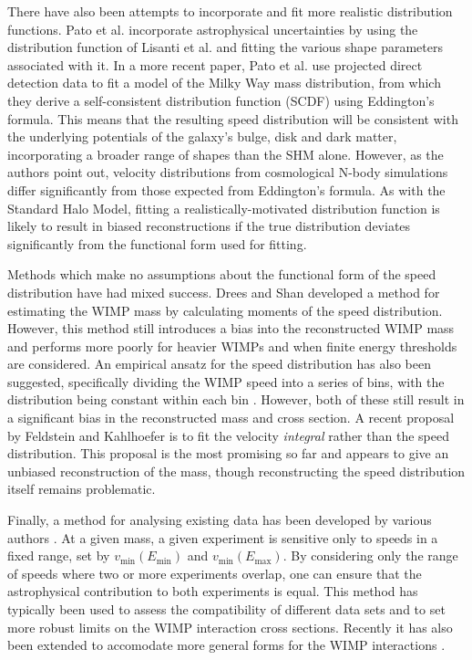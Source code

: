 There have also been attempts to incorporate and fit more realistic distribution functions. Pato et al. \cite{Pato:2011} incorporate astrophysical uncertainties by using the distribution function of Lisanti et al. \cite{Lisanti:2010} and fitting the various shape parameters associated with it. In a more recent paper, Pato et al. \cite{Pato:2013} use projected direct detection data to fit a model of the Milky Way mass distribution, from which they derive a self-consistent distribution function (SCDF) using Eddington's formula. This means that the resulting speed distribution will be consistent with the underlying potentials of the galaxy's bulge, disk and dark matter, incorporating a broader range of shapes than the SHM alone. However, as the authors point out, velocity distributions from cosmological N-body simulations differ significantly from those expected from Eddington's formula. As with the Standard Halo Model, fitting a realistically-motivated distribution function is likely to result in biased reconstructions if the true distribution deviates significantly from the functional form used for fitting.

Methods which make no assumptions about the functional form of the speed distribution have had mixed success. Drees and Shan \cite{Drees:2007, Drees:2008} developed a method for estimating the WIMP mass by calculating moments of the speed distribution. However, this method still introduces a bias into the reconstructed WIMP mass and performs more poorly for heavier WIMPs and when finite energy thresholds are considered. An empirical ansatz for the speed distribution has also been suggested, specifically dividing the WIMP speed into a series of bins, with the distribution being constant within each bin \cite{Peter:2011}.  However, both of these still result in a significant bias in the reconstructed mass and cross section. A recent proposal by Feldstein and Kahlhoefer \cite{Feldstein:2014} is to fit the velocity \textit{integral} rather than the speed distribution. This proposal is the most promising so far and appears to give an unbiased reconstruction of the mass, though reconstructing the speed distribution itself remains problematic. 

Finally, a method for analysing existing data has been developed by various authors \cite{Fox:2011b,Frandsen:2012, Gondolo:2012}. At a given mass, a given experiment is sensitive only to speeds in a fixed range, set by $v_\textrm{min}(E_\textrm{min})$ and $v_\textrm{min}(E_\textrm{max})$. By considering only the range of speeds where two or more experiments overlap, one can ensure that the astrophysical contribution to both experiments is equal. This method has typically been used to assess the compatibility of different data sets and to set more robust limits on the WIMP interaction cross sections. Recently it has also been extended to accomodate more general forms for the WIMP interactions \cite{DelNobile:2013}. 

